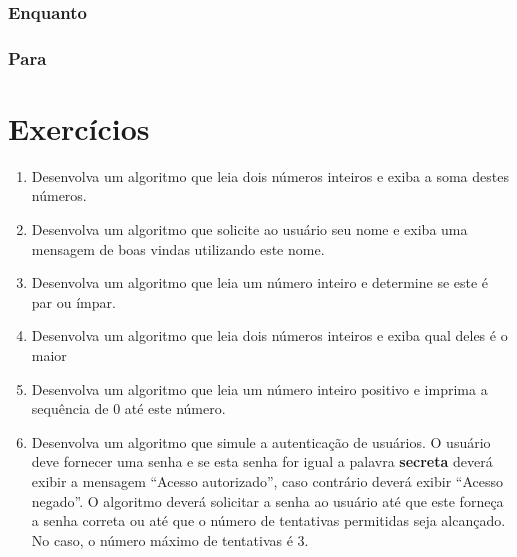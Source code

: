 \documentclass[11pt]{ifscarticle}
\begin{document}
\subsubsection{Enquanto}




\subsubsection{Para}




\section{Exercícios}

\begin{enumerate}
    \item Desenvolva um algoritmo	que leia dois números inteiros e exiba a soma destes números.
    \item Desenvolva um algoritmo que solicite ao usuário seu nome e exiba uma mensagem de boas vindas utilizando este nome.
    \item Desenvolva um algoritmo que leia um número inteiro e determine se este é par ou ímpar.
    \item Desenvolva um algoritmo que leia dois números inteiros e exiba qual deles é o maior 
    \item Desenvolva um algoritmo que leia um número inteiro positivo e imprima a sequência de 0 até este número. 		\item Desenvolva um algoritmo que simule a autenticação de usuários. O usuário deve fornecer uma senha e se esta senha for igual a palavra \textbf{secreta} deverá exibir a mensagem ``Acesso autorizado'', caso contrário deverá exibir ``Acesso negado''. O algoritmo deverá solicitar a senha ao usuário até que este forneça a senha correta ou até que o número de tentativas permitidas seja alcançado. No caso, o número máximo de tentativas é $3$.
\end{enumerate}


\vspace*{\fill}
\licenciamentoLivre
\end{document}
